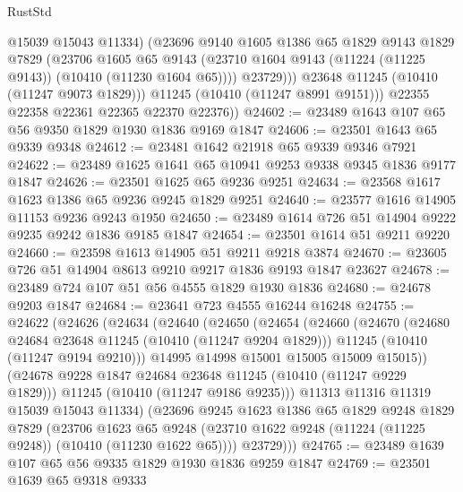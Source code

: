 \begin{lexlean}{RustStd}
\begin{coremodule}
                  @15039
                  @15043
                  @11334)
                (@23696
                  @9140
                  @1605
                  @1386
                  @65
                  @1829
                  @9143
                  @1829
                  @7829
                  (@23706
                    @1605
                    @65
                    @9143
                    (@23710 @1604 @9143 (@11224 (@11225 @9143)) (@10410 (@11230 @1604 @65))))
                  @23729)))
            @23648
            @11245
            (@10410 (@11247 @9073 @1829)))
          @11245
          (@10410 (@11247 @8991 @9151)))
        @22355
        @22358
        @22361
        @22365
        @22370
        @22376))
@24602 := @23489 @1643 @107 @65 @56 @9350 @1829 @1930 @1836 @9169 @1847
@24606 := @23501 @1643 @65 @9339 @9348
@24612 := @23481 @1642 @21918 @65 @9339 @9346 @7921
@24622 := @23489 @1625 @1641 @65 @10941 @9253 @9338 @9345 @1836 @9177 @1847
@24626 := @23501 @1625 @65 @9236 @9251
@24634 := @23568 @1617 @1623 @1386 @65 @9236 @9245 @1829 @9251
@24640 := @23577 @1616 @14905 @11153 @9236 @9243 @1950
@24650 := @23489 @1614 @726 @51 @14904 @9222 @9235 @9242 @1836 @9185 @1847
@24654 := @23501 @1614 @51 @9211 @9220
@24660 := @23598 @1613 @14905 @51 @9211 @9218 @3874
@24670 := @23605 @726 @51 @14904 @8613 @9210 @9217 @1836 @9193 @1847 @23627
@24678 := @23489 @724 @107 @51 @56 @4555 @1829 @1930 @1836
@24680 := @24678 @9203 @1847
@24684 := @23641 @723 @4555 @16244 @16248
@24755 := @24622
    (@24626
      (@24634
        (@24640
          (@24650
            (@24654
              (@24660
                (@24670
                  (@24680 @24684 @23648 @11245 (@10410 (@11247 @9204 @1829)))
                  @11245
                  (@10410 (@11247 @9194 @9210)))
                @14995
                @14998
                @15001
                @15005
                @15009
                @15015))
            (@24678 @9228 @1847 @24684 @23648 @11245 (@10410 (@11247 @9229 @1829)))
            @11245
            (@10410 (@11247 @9186 @9235)))
          @11313
          @11316
          @11319
          @15039
          @15043
          @11334)
        (@23696
          @9245
          @1623
          @1386
          @65
          @1829
          @9248
          @1829
          @7829
          (@23706
            @1623
            @65
            @9248
            (@23710 @1622 @9248 (@11224 (@11225 @9248)) (@10410 (@11230 @1622 @65))))
          @23729)))
@24765 := @23489 @1639 @107 @65 @56 @9335 @1829 @1930 @1836 @9259 @1847
@24769 := @23501 @1639 @65 @9318 @9333

\end{coremodule}
\end{lexlean}
